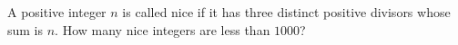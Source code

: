 A positive integer $n$ is called nice if it has three distinct positive divisors whose sum is $n$. How many nice integers are less than $1000$?
